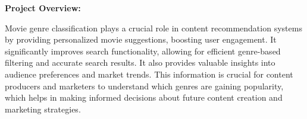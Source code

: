 \documentclass[hbrs-poster.tex]{subfiles}
\begin{document}
    {
    
        \textbf{Project Overview:}

        Movie genre classification plays a crucial role in content recommendation systems by providing personalized movie suggestions, boosting user engagement. It significantly improves search functionality, allowing for efficient genre-based filtering and accurate search results. 
        It also provides valuable insights into audience preferences and market trends. This information is crucial for content producers and marketers to understand which genres are gaining popularity, which helps in making informed decisions about future content creation and marketing strategies.\\
        
}
\end{document}
